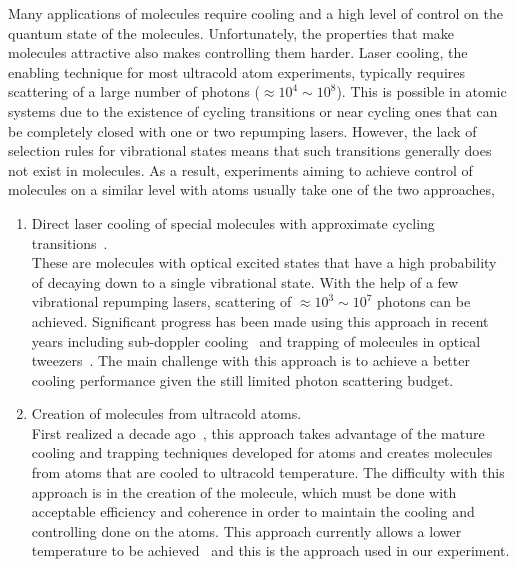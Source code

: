 Many applications of molecules require cooling and a high level of control
on the quantum state of the molecules.
Unfortunately, the properties that make molecules attractive
also makes controlling them harder.
Laser cooling, the enabling technique for most ultracold atom experiments,
typically requires scattering of a large number of photons ($\approx\!10^4\sim10^8$).
This is possible in atomic systems due to the existence of cycling transitions
or near cycling ones that can be completely closed with one or two repumping lasers.
However, the lack of selection rules for vibrational states means that
such transitions generally does not exist in molecules.
As a result, experiments aiming to achieve control of molecules on a similar level with atoms
usually take one of the two approaches,
\begin{enumerate}
\item Direct laser cooling of special molecules
  with approximate cycling transitions~\cite{barry_magneto-optical_2014,
    norrgard_submillikelvin_2016,truppe_molecules_2017,
    anderegg_laser_2018,mccarron_magnetic_2018,collopy_3d_2018,
    mitra_direct_2020,ding_sub-doppler_2020}.\\
  These are molecules with optical excited states that have a high probability
  of decaying down to a single vibrational state.
  With the help of a few vibrational repumping lasers,
  scattering of $\approx\!10^3\sim10^7$ photons can be achieved.
  Significant progress has been made using this approach in recent years
  including sub-doppler cooling~\cite{cheuk_mathrmlambda-enhanced_2018}
  and trapping of molecules in optical tweezers~\cite{anderegg_optical_2019}.
  The main challenge with this approach is to achieve a better cooling performance
  given the still limited photon scattering budget.
\item Creation of molecules from ultracold atoms.\\
  First realized a decade ago~\cite{ni_high_2008,lang_ultracold_2008},
  this approach takes advantage of the mature cooling and trapping techniques
  developed for atoms and creates molecules from atoms
  that are cooled to ultracold temperature.
  The difficulty with this approach is in the creation of the molecule,
  which must be done with acceptable efficiency and coherence
  in order to maintain the cooling and controlling done on the atoms.
  This approach currently allows a lower temperature to be achieved~\cite{
    marco_degenerate_2019,zhang_forming_2020,he_coherently_2020}
  and this is the approach used in our experiment.
\end{enumerate}

